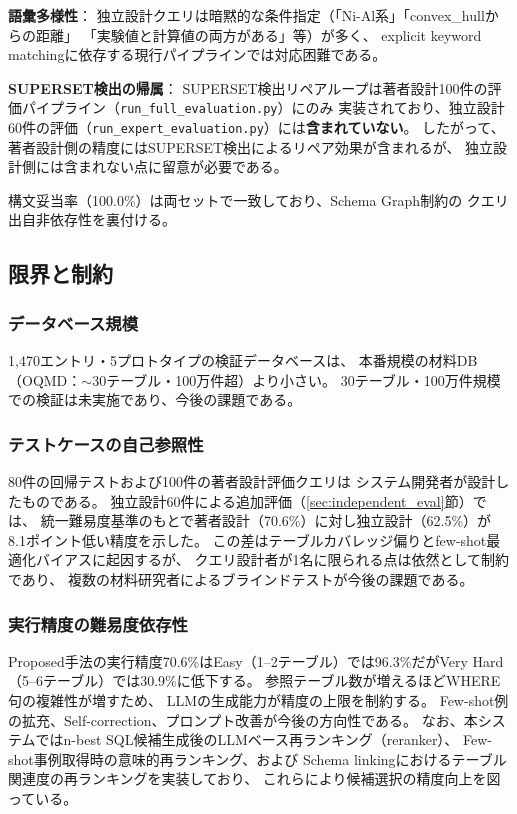 \documentclass[5p,twocolumn]{elsarticle}
\begin{document}
\textbf{語彙多様性}：
独立設計クエリは暗黙的な条件指定（「Ni-Al系」「convex\_hullからの距離」
「実験値と計算値の両方がある」等）が多く、
explicit keyword matchingに依存する現行パイプラインでは対応困難である。

\textbf{SUPERSET検出の帰属}：
SUPERSET検出リペアループは著者設計100件の評価パイプライン（\texttt{run\_full\_evaluation.py}）にのみ
実装されており、独立設計60件の評価（\texttt{run\_expert\_evaluation.py}）には\textbf{含まれていない}。
したがって、著者設計側の精度にはSUPERSET検出によるリペア効果が含まれるが、
独立設計側には含まれない点に留意が必要である。

構文妥当率（100.0\%）は両セットで一致しており、Schema Graph制約の
クエリ出自非依存性を裏付ける。

\subsection{限界と制約}
\label{sec:limitations}

\subsubsection{データベース規模}

1{,}470エントリ・5プロトタイプの検証データベースは、
本番規模の材料DB（OQMD：${\sim}30$テーブル・100万件超）より小さい。
30テーブル・100万件規模での検証は未実施であり、今後の課題である。

\subsubsection{テストケースの自己参照性}

80件の回帰テストおよび100件の著者設計評価クエリは
システム開発者が設計したものである。
独立設計60件による追加評価（\ref{sec:independent_eval}節）では、
統一難易度基準のもとで著者設計（70.6\%）に対し独立設計（62.5\%）が
8.1ポイント低い精度を示した。
この差はテーブルカバレッジ偏りとfew-shot最適化バイアスに起因するが、
クエリ設計者が1名に限られる点は依然として制約であり、
複数の材料研究者によるブラインドテストが今後の課題である。

\subsubsection{実行精度の難易度依存性}

Proposed手法の実行精度70.6\%はEasy（1--2テーブル）では96.3\%だがVery Hard（5--6テーブル）では30.9\%に低下する。
参照テーブル数が増えるほどWHERE句の複雑性が増すため、
LLMの生成能力が精度の上限を制約する。
Few-shot例の拡充、Self-correction、プロンプト改善が今後の方向性である。
なお、本システムではn-best SQL候補生成後のLLMベース再ランキング（reranker）、
Few-shot事例取得時の意味的再ランキング、および
Schema linkingにおけるテーブル関連度の再ランキングを実装しており、
これらにより候補選択の精度向上を図っている。
\end{document}
